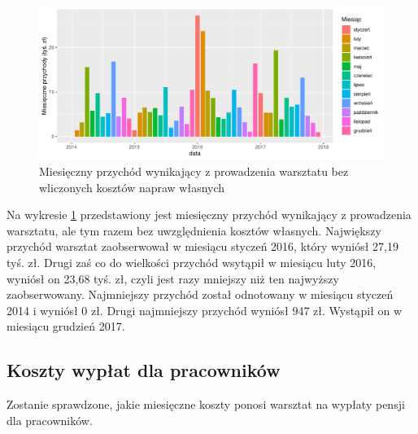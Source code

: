 \documentclass{article}\usepackage[]{graphicx}\usepackage[]{xcolor}
\makeatletter
\def\maxwidth{ %
  \ifdim\Gin@nat@width>\linewidth
    \linewidth
  \else
    \Gin@nat@width
  \fi
}
\newenvironment{knitrout}{}{} %
\makeatother
\begin{document}
\begin{knitrout}
\color{fgcolor}\begin{figure}[H]

{\centering \includegraphics[width=\maxwidth]{figure/fig_uslugi2-1} 

}

\caption[Miesięczny przychód wynikający z prowadzenia warsztatu bez wliczonych kosztów napraw własnych]{Miesięczny przychód wynikający z prowadzenia warsztatu bez wliczonych kosztów napraw własnych}\label{fig:fig_uslugi2}
\end{figure}

\end{knitrout}

Na wykresie \ref{fig:fig_uslugi2} przedstawiony jest miesięczny przychód wynikający z prowadzenia warsztatu, ale tym razem bez uwzględnienia kosztów własnych. 
Największy przychód warsztat zaobserwował w miesiącu styczeń 2016, który wyniósł 27,19 tyś. zł.
Drugi zaś co do wielkości przychód wsytąpił w miesiącu luty 2016, wyniósł on 23,68 tyś. zł, czyli jest  razy mniejszy niż ten najwyższy zaobserwowany.
Najmniejszy przychód został odnotowany w miesiącu styczeń 2014 i wyniósł 0 zł. 
Drugi najmniejszy przychód wyniósł 947 zł. Wystąpił on w miesiącu grudzień 2017.

\subsection{Koszty wypłat dla pracowników}

Zostanie sprawdzone, jakie miesięczne koszty ponosi warsztat na wypłaty pensji dla pracowników.

\end{document}
